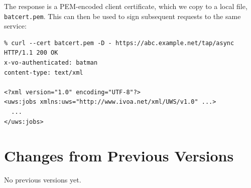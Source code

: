 \documentclass[11pt,a4paper]{ivoa}
\begin{document}
\noindent
The response is a PEM-encoded client certificate, which we copy
to a local file, \verb|batcert.pem|.
This can then be used to sign subsequent requests to the same service:
{\footnotesize
\begin{verbatim}
% curl --cert batcert.pem -D - https://abc.example.net/tap/async
HTTP/1.1 200 OK
x-vo-authenticated: batman
content-type: text/xml

<?xml version="1.0" encoding="UTF-8"?>
<uws:jobs xmlns:uws="http://www.ivoa.net/xml/UWS/v1.0" ...>
  ...
</uws:jobs>
\end{verbatim}
}



\appendix
\section{Changes from Previous Versions}

No previous versions yet.



\end{document}
